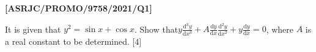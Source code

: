 \item \textbf{{[}ASRJC/PROMO/9758/2021/Q1{]} }

It is given that $y^{2}=\sin x+\cos x$. Show that$y\frac{\text{d}^{3}y}{\text{d}x^{3}}+A\frac{\text{d}y}{\text{d}x}\frac{\text{d}^{2}y}{\text{d}x^{2}}+y\frac{\text{d}y}{\text{d}x}=0$,
where $A$ is a real constant to be determined. \hfill{}{[}4{]}